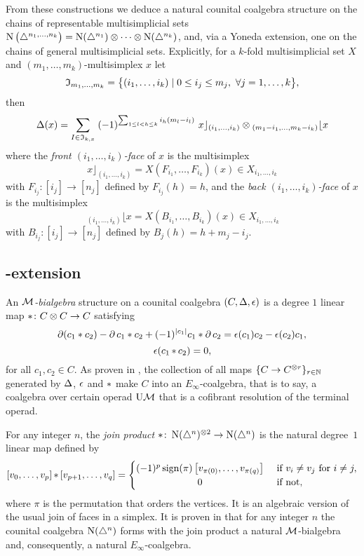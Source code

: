 From these constructions we deduce a natural counital coalgebra structure on the chains of representable multisimplicial sets $\chains \big( \simplex^{n_1, \dots, n_k} \big) = \chains(\simplex^{n_1}) \ot \dotsb \ot \chains(\simplex^{n_k})$, and, via a Yoneda extension, one on the chains of general multisimplicial sets.
Explicitly, for a $k$-fold multisimplicial set $X$ and $(m_1,\dots,m_k)$-multisimplex $x$ let
\[
\fI_{m_1,\dots,m_k} = \set[\big]{(i_{1},\dots,i_{k}) \mid 0 \le i_j \le m_j,\ \forall j = 1,\dots,k},
\]
then
\[
\copr(x) =
\sum_{I\in \mathfrak{I}_{k,x}} \;
(-1)^{\sum_{1 \leq l<h \leq k} i_h (m_l-i_l) } \
x \rfloor_{(i_{1},\dots,i_{k})} \ot
\!\,_{(m_{1}-i_{1}, \dots, m_{k}-i_{k})} \lfloor x
\]
where the \textit{front $(i_1,\dots,i_k)$-face} of $x$ is the multisimplex
\[
x \rfloor_{(i_{1}, \dots, i_{k})} =
X(F_{i_1}, \dots, F_{i_k})(x) \in X_{i_1,\dots,i_k}
\]
with
$F_{i_j} \colon [i_j] \to [n_j]$ defined by $F_{i_j}(h)=h$, and the \textit{back $(i_1,\dots,i_k)$-face} of $x$ is the multisimplex
\[
\,_{(i_{1}, \dots, i_{k})} \lfloor x =
X(B_{i_1}, \dots, B_{i_k})(x) \in X_{i_1,\dots,i_k}
\]
with $B_{i_j} \colon [i_j] \to [n_j]$ defined by $B_j(h) = h+m_j-i_j$.

\subsection{\pdfEinfty-extension} \label{ss:e-infty extension}

An \textit{$\cM$-bialgebra} structure on a counital coalgebra $(C, \copr, \aug)$ is a degree $1$ linear map $\pr \colon C \ot C \to C$ satisfying
\[
\bd (c_1 \ast c_2) - \bd c_1 \ast c_2 + (-1)^{\bars{c_1}} c_1 \ast \bd c_2 =
\aug(c_1) c_2 - \aug(c_2) c_1,
\]
\[
\aug (c_1 \pr c_2) = 0,
\]
for all $c_1, c_2 \in C$.
As proven in \cite{medina2020prop1}, the collection of all maps $\set{C \to C^{\ot r}}_{r \in \N}$ generated by $\copr$, $\aug$ and $\pr$ make $C$ into an $E_\infty$-coalgebra, that is to say, a coalgebra over certain operad $\UM$ that is a cofibrant resolution of the terminal operad.

For any integer $n$, the \textit{join product} $\ast \colon \chains(\simplex^n)^{\ot 2} \to \chains(\simplex^n)$ is the natural degree~$1$ linear map defined by
\begin{equation*}
	\left[v_0, \dots, v_p \right] \pr \left[v_{p+1}, \dots, v_q\right] =
	\begin{cases} (-1)^{p} \sign(\pi) \left[v_{\pi(0)}, \dots, v_{\pi(q)}\right] & \text{ if } v_i \neq v_j \text{ for } i \neq j, \\
		\hfil 0 & \text{ if not}, \end{cases}
\end{equation*}
where $\pi$ is the permutation that orders the vertices.
It is an algebraic version of the usual join of faces in a simplex.
It is proven in \cite{medina2020prop1} that for any integer $n$ the counital coalgebra $\chains(\simplex^n)$ forms with the join product a natural $\cM$-bialgebra and, consequently, a natural $E_\infty$-coalgebra.

